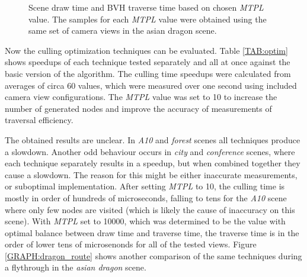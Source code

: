 \documentclass[report,11pt]{elsarticle}
\begin{document}
\begin{figure}[H]
\begin{center}
\caption{Scene draw time and BVH traverse time based on chosen \emph{MTPL} value. The samples for each \emph{MTPL} value were obtained using the same set of camera views in the asian dragon scene.}
\label{GRAPH:mtpl}
\end{center}
\end{figure}

Now the culling optimization techniques can be evaluated. Table \ref{TAB:optim} shows speedups of each technique tested separately and all at once against the basic version of the algorithm. The culling time speedups were calculated from averages of circa 60 values, which were measured over one second using included camera view configurations. The \emph{MTPL} value was set to 10 to increase the number of generated nodes and improve the accuracy of measurements of traversal efficiency.

The obtained results are unclear. In \emph{A10} and \emph{forest} scenes all techniques produce a slowdown. Another odd behaviour occurs in \emph{city} and \emph{conference} scenes, where each technique separately results in a speedup, but when combined together they cause a slowdown. The reason for this might be either inaccurate measurements, or suboptimal implementation. After setting \emph{MTPL} to 10, the culling time is mostly in order of hundreds of microseconds, falling to tens for the \emph{A10} scene where only few nodes are visited (which is likely the cause of inaccuracy on this scene). With \emph{MTPL} set to 10000, which was determined to be the value with optimal balance between draw time and traverse time, the traverse time is in the order of lower tens of microsenonds for all of the tested views. Figure \ref{GRAPH:dragon_route} shows another comparison of the same techniques during a flythrough in the \emph{asian dragon} scene. 
\end{document}

